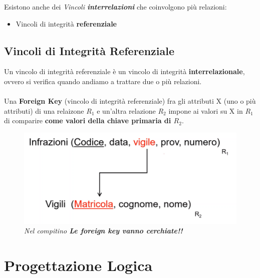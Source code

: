 \documentclass[12pt, a4paper]{article}
\begin{document}
    Esistono anche dei \textit{Vincoli \textbf{interrelazioni}} che coinvolgono più relazioni:
    \begin{itemize}
        \item Vincoli di integrità \textbf{referenziale}
    \end{itemize}

    \subsection{Vincoli di Integrità Referenziale}
    Un vincolo di integrità referenziale è un vincolo di integrità \textbf{interrelazionale}, ovvero si verifica quando andiamo
    a trattare due o più relazioni. 
    \\\\Una \textbf{Foreign Key} (vincolo di integrità referenziale) fra gli attributi X (uno o più attributi) di una relaizone $R_1$ e un'altra relazione $R_2$ impone ai valori 
    su X in $R_1$ di comparire \textbf{come valori della chiave primaria di $R_2$}.

    \begin{figure}[htbp]
        \centering
        \includegraphics[scale=0.5]{foreignkey.png}
        \\\textit{Nel compitino \textbf{Le foreign key vanno cerchiate!!}}
    \end{figure}

    \section{Progettazione Logica}
\end{document}

